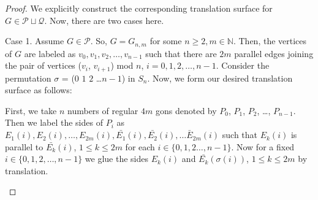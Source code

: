 \documentclass[10pt,a4paper]{amsart}
\newcommand{\N}{\mathbb{N}}
\begin{document}
\begin{proof}
We explicitly construct the corresponding translation surface for $G\in\mathcal{P} \sqcup \mathcal{Q}$.
Now, there are two cases here.

Case 1.
Assume $G\in \mathcal{P}$. So, $G=G_{n,m}$ for some $n\ge 2, m\in \N$. Then, the vertices of $G$ are labeled as $v_0, v_1, v_2, \dots, v_{n-1}$ such that there are $2m$ parallel edges joining the pair of vertices ($v_i$, $v_{i+1}$) mod $n$, $i= 0,1,2, \dots, n-1$. Consider the permutation $\sigma$ = ($0$ $1$ $2$ \dots $n-1$) in $S_n$. Now, we form our desired translation surface as follows:

First, we take $n$ numbers of regular $4m$ gons denoted by $P_0$, $P_1$, $P_2$, \dots, $P_{n-1}$. Then we label the sides of $P_i$ as $E_1(i), E_2(i), \dots, E_{2m}(i), \bar{E_1}(i), \bar{E_2}(i), \dots \bar{E}_{2m}(i)$ such that $E_k(i)$ is parallel to $\bar{E_k}(i)$, $1\leq k\leq 2m$ for each $i\in \{0,1,2 \dots, n-1\}$. Now for a fixed $i\in\{0, 1, 2, \dots, n-1\}$ we glue the sides $E_k(i)$ and $\bar{E_k}(\sigma(i))$, $1\leq k\leq 2m$  by translation. 
\begin{figure}[htbp]
\begin{center}
\end{center}
\end{figure}
\end{proof}
\end{document}
